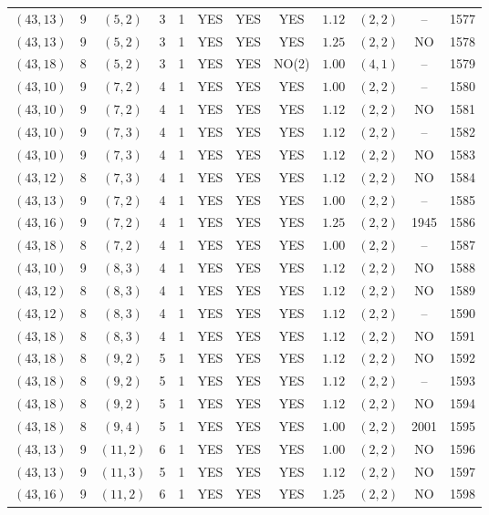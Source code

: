 \begin{longtable}{|c|c|c|c|c|c|c|c|c|c|c|c|}
$(43,13)$ & 9 & $(5,2)$ & 3 & 1 & YES & YES & YES & $1.12$ & $(2,2)$ & -- & 1577\\
$(43,13)$ & 9 & $(5,2)$ & 3 & 1 & YES & YES & YES & $1.25$ & $(2,2)$ & NO & 1578\\
$(43,18)$ & 8 & $(5,2)$ & 3 & 1 & YES & YES & NO(2) & $1.00$ & $(4,1)$ & -- & 1579\\
$(43,10)$ & 9 & $(7,2)$ & 4 & 1 & YES & YES & YES & $1.00$ & $(2,2)$ & -- & 1580\\
$(43,10)$ & 9 & $(7,2)$ & 4 & 1 & YES & YES & YES & $1.12$ & $(2,2)$ & NO & 1581\\
$(43,10)$ & 9 & $(7,3)$ & 4 & 1 & YES & YES & YES & $1.12$ & $(2,2)$ & -- & 1582\\
$(43,10)$ & 9 & $(7,3)$ & 4 & 1 & YES & YES & YES & $1.12$ & $(2,2)$ & NO & 1583\\
$(43,12)$ & 8 & $(7,3)$ & 4 & 1 & YES & YES & YES & $1.12$ & $(2,2)$ & NO & 1584\\
$(43,13)$ & 9 & $(7,2)$ & 4 & 1 & YES & YES & YES & $1.00$ & $(2,2)$ & -- & 1585\\
$(43,16)$ & 9 & $(7,2)$ & 4 & 1 & YES & YES & YES & $1.25$ & $(2,2)$ & 1945 & 1586\\
$(43,18)$ & 8 & $(7,2)$ & 4 & 1 & YES & YES & YES & $1.00$ & $(2,2)$ & -- & 1587\\
$(43,10)$ & 9 & $(8,3)$ & 4 & 1 & YES & YES & YES & $1.12$ & $(2,2)$ & NO & 1588\\
$(43,12)$ & 8 & $(8,3)$ & 4 & 1 & YES & YES & YES & $1.12$ & $(2,2)$ & NO & 1589\\
$(43,12)$ & 8 & $(8,3)$ & 4 & 1 & YES & YES & YES & $1.12$ & $(2,2)$ & -- & 1590\\
$(43,18)$ & 8 & $(8,3)$ & 4 & 1 & YES & YES & YES & $1.12$ & $(2,2)$ & NO & 1591\\
$(43,18)$ & 8 & $(9,2)$ & 5 & 1 & YES & YES & YES & $1.12$ & $(2,2)$ & NO & 1592\\
$(43,18)$ & 8 & $(9,2)$ & 5 & 1 & YES & YES & YES & $1.12$ & $(2,2)$ & -- & 1593\\
$(43,18)$ & 8 & $(9,2)$ & 5 & 1 & YES & YES & YES & $1.12$ & $(2,2)$ & NO & 1594\\
$(43,18)$ & 8 & $(9,4)$ & 5 & 1 & YES & YES & YES & $1.00$ & $(2,2)$ & 2001 & 1595\\
$(43,13)$ & 9 & $(11,2)$ & 6 & 1 & YES & YES & YES & $1.00$ & $(2,2)$ & NO & 1596\\
$(43,13)$ & 9 & $(11,3)$ & 5 & 1 & YES & YES & YES & $1.12$ & $(2,2)$ & NO & 1597\\
$(43,16)$ & 9 & $(11,2)$ & 6 & 1 & YES & YES & YES & $1.25$ & $(2,2)$ & NO & 1598\\

\end{longtable}
